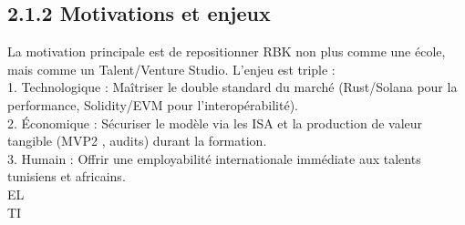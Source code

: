 \documentclass[12pt,landscape,a4paper]{article}
\begin{document}
\subsection{2.1.2 Motivations et enjeux}
La motivation principale est de repositionner RBK non plus comme une école, mais comme un Talent/Venture Studio. L’enjeu est triple :\\
\vspace{0.5em}
1. Technologique : Maîtriser le double standard du marché (Rust/Solana pour la performance, Solidity/EVM pour l’interopérabilité).\\
\vspace{0.5em}
2. Économique : Sécuriser le modèle via les ISA et la production de valeur tangible (MVP2 , audits) durant la formation.\\
\vspace{0.5em}
3. Humain : Offrir une employabilité internationale immédiate aux talents tunisiens et africains.\\
\vspace{0.5em}
\vspace{0.5em}
\vspace{0.5em}
\vspace{0.5em}
EL\\
TI\\
\end{document}
